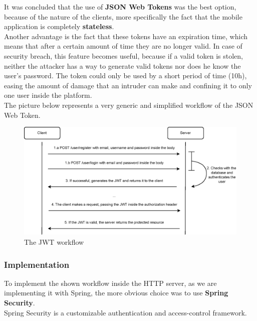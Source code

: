 It was concluded that the use of \textbf{JSON Web Tokens}\cite{jwt} was the best option, because of the nature of the clients, more specifically the fact that
the mobile application is completely \textbf{stateless}.\\

Another advantage is the fact that these tokens have an expiration time, which means that after a certain amount of time they are no longer valid.
In case of security breach, this feature becomes useful, because if a valid token is stolen, neither the attacker has a way to generate valid tokens 
nor does he know the user's password. The token could only be used by a short period of time (10h), easing the amount of damage that an intruder can
make and confining it to only one user inside the platform.\\

The picture below represents a very generic and simplified workflow of the JSON Web Token. 

\begin{figure}[H]
    \begin{center}
        \includegraphics[scale=0.9]{_figures/JWT-simple-diagram.eps}
        \caption{The JWT workflow}
    \end{center}
\end{figure}

\subsubsection{Implementation}

To implement the shown workflow inside the HTTP server, as we are implementing it with Spring, the more obvious choice was to use \textbf{Spring Security}\cite{springsecurity}.\\

Spring Security is a customizable authentication and access-control framework.\\

